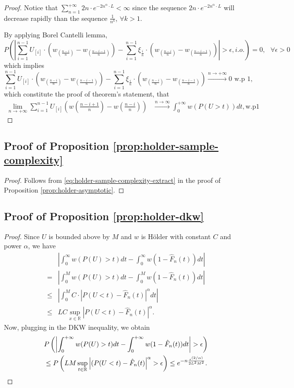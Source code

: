 \begin{proof}
Notice that $\sum_{n=1}^{+\infty}  2n \cdot e^{-2n^{\alpha}\cdot L}< \infty$ since the sequence 
$2n \cdot e^{-2n^{\alpha}\cdot L}$ will decrease rapidly than the sequence
$\frac{1}{n^k}$, $\forall k>1$.

By applying Borel Cantelli lemma,
$$
P ( \left| \sum_{i=1}^{n-1} U_{[i]} \cdot (w_{(\frac{n-i}{n})} - w_{(\frac{n-i-1}{n})}) -
\sum_{i=1}^{n-1} \xi_{\frac{i}{n}} \cdot (w_{(\frac{n-i}{n})} - w_{(\frac{n-i-1}{n})}) \right| >
\epsilon , i.o.) =0 , \text{   } \forall \epsilon >0 $$
which implies 
$$
\sum_{i=1}^{n-1} U_{[i]} \cdot (w_{(\frac{n-i}{n})} - w_{(\frac{n-i-1}{n})}) - \sum_{i=1}^{n-1}
\xi_{\frac{i}{n}} \cdot (w_{(\frac{n-i}{n})} - w_{(\frac{n-i-1}{n})}) \xrightarrow{n \rightarrow
+\infty} 0 \text{   w.p } 1 ,
$$
which constitute the proof of theorem's statement, that 
\begin{align}
\lim_{n\rightarrow +\infty} \sum_{i=1}^{n-1} U_{ [i ] } (w(\frac{n-i+1}{n})- w(\frac{n-i}{n}))
&\xrightarrow{n \rightarrow\infty} \int_0^{+\infty} w(P(U>t)) dt, \text{w.p} 1
\end{align}

\end{proof}

\subsection*{Proof of Proposition \ref{prop:holder-sample-complexity}}
\begin{proof}
Follows from \eqref{eq:holder-sample-complexity-extract} in the proof of Proposition \ref{prop:holder-asymptotic}.
\end{proof}

\subsection*{Proof of Proposition \ref{prop:holder-dkw}}
\begin{proof}

Since $U$ is bounded above by $M$ and $w$ is H\"{o}lder with constant $C$ and power $\alpha$, we have
\begin{align*}
&\left|\int_0^{\infty} w(P(U)>t) dt- \int_0^{\infty} w(1- {\hat F_n}(t)) dt\right| \\ = &
    \left|\int_0^M w(P(U)>t) dt- \int_0^M w(1- {\hat F_n}(t)) dt\right| \\
\leq& \left|\int_0^M C\cdot |P(U<t)-{\hat F_n}(t)|^\alpha dt\right|\\ \leq& LC\sup_{x\in
\mathbb{R}}\left|P(U<t)-{\hat F_n}(t)\right|^\alpha.
\end{align*}
Now, plugging in the DKW inequality, we obtain
\begin{align}
&
P\left(\left|\intinfinity w(P(U)>t) dt- \intinfinity w(1- {\hat F_n}(t)) dt\right|>\epsilon\right)
\nonumber\\
& \leq P\left(LM\sup_{t\in \mathbb{R}} \left|(P(U<t)-{\hat F_n}(t)\right|^\alpha>\epsilon\right)
\leq  e^{-n \frac{\epsilon ^{(2/\alpha)}} {2 L^2 M^2}}.\label{eq:dkw3}
\end{align}
\end{proof}


